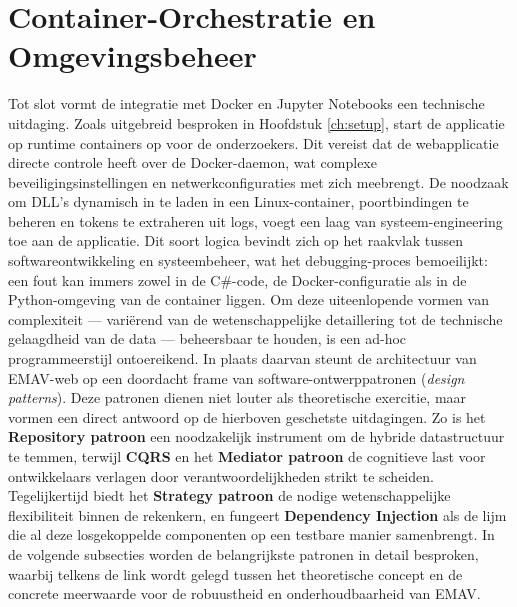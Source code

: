 \section{Container-Orchestratie en Omgevingsbeheer}
Tot slot vormt de integratie met Docker en Jupyter Notebooks een technische uitdaging. Zoals uitgebreid besproken in Hoofdstuk \ref{ch:setup}, start de applicatie op runtime containers op voor de onderzoekers. Dit vereist dat de webapplicatie directe controle heeft over de Docker-daemon, wat complexe beveiligingsinstellingen en netwerkconfiguraties met zich meebrengt.
De noodzaak om DLL's dynamisch in te laden in een Linux-container, poortbindingen te beheren en tokens te extraheren uit logs, voegt een laag van systeem-engineering toe aan de applicatie. Dit soort logica bevindt zich op het raakvlak tussen softwareontwikkeling en systeembeheer, wat het debugging-proces bemoeilijkt: een fout kan immers zowel in de C\#-code, de Docker-configuratie als in de Python-omgeving van de container liggen.
Om deze uiteenlopende vormen van complexiteit — variërend van de wetenschappelijke detaillering tot de technische gelaagdheid van de data — beheersbaar te houden, is een ad-hoc programmeerstijl ontoereikend. In plaats daarvan steunt de architectuur van EMAV-web op een doordacht frame van software-ontwerppatronen (\textit{design patterns}). Deze patronen dienen niet louter als theoretische exercitie, maar vormen een direct antwoord op de hierboven geschetste uitdagingen.
Zo is het \textbf{Repository patroon} een noodzakelijk instrument om de hybride datastructuur te temmen, terwijl \textbf{CQRS} en het \textbf{Mediator patroon} de cognitieve last voor ontwikkelaars verlagen door verantwoordelijkheden strikt te scheiden. Tegelijkertijd biedt het \textbf{Strategy patroon} de nodige wetenschappelijke flexibiliteit binnen de rekenkern, en fungeert \textbf{Dependency Injection} als de lijm die al deze losgekoppelde componenten op een testbare manier samenbrengt. In de volgende subsecties worden de belangrijkste patronen in detail besproken, waarbij telkens de link wordt gelegd tussen het theoretische concept en de concrete meerwaarde voor de robuustheid en onderhoudbaarheid van EMAV.
